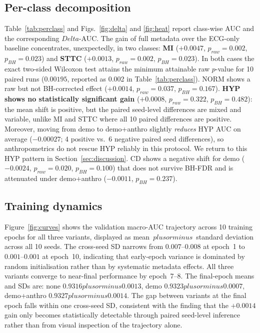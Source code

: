 \documentclass[mathematics,article,submit,pdftex]{Definitions/mdpi}
\def\texttt#1{#1}%
\def\mathrm#1{#1}%
\def\Delta{Delta }%
\def\pm{plus or minus }%
\begin{document}
\subsection{Per-class decomposition}
Table~\ref{tab:perclass} and Figs.~\ref{fig:delta} and \ref{fig:heat} report class-wise AUC and the corresponding $\Delta$-AUC. The gain of full metadata over the ECG-only baseline concentrates, unexpectedly, in two classes: \textbf{MI} ($+0.0047$, $p_{\mathrm{raw}}{=}0.002$, $p_{\mathrm{BH}}{=}0.023$) and \textbf{STTC} ($+0.0013$, $p_{\mathrm{raw}}{=}0.002$, $p_{\mathrm{BH}}{=}0.023$). In both cases the exact two-sided Wilcoxon test attains the minimum attainable raw $p$-value for 10 paired runs ($0.00195$, reported as 0.002 in Table~\ref{tab:perclass}). NORM shows a raw but not BH-corrected effect ($+0.0014$, $p_{\mathrm{raw}}{=}0.037$, $p_{\mathrm{BH}}{=}0.167$). \textbf{HYP shows no statistically significant gain} ($+0.0008$, $p_{\mathrm{raw}}{=}0.322$, $p_{\mathrm{BH}}{=}0.482$): the mean shift is positive, but the paired seed-level differences are mixed and variable, unlike MI and STTC where all 10 paired differences are positive. Moreover, moving from \texttt{demo} to \texttt{demo+anthro} slightly \emph{reduces} HYP AUC on average ($-0.00027$; 4 positive vs.\ 6 negative paired seed differences), so anthropometrics do not rescue HYP reliably in this protocol. We return to this HYP pattern in Section~\ref{sec:discussion}. CD shows a negative shift for \texttt{demo} ($-0.0024$, $p_{\mathrm{raw}}{=}0.020$, $p_{\mathrm{BH}}{=}0.100$) that does not survive BH-FDR and is attenuated under \texttt{demo+anthro} ($-0.0011$, $p_{\mathrm{BH}}{=}0.237$).

\subsection{Training dynamics}
Figure~\ref{fig:curves} shows the validation macro-AUC trajectory across 10 training epochs for all three variants, displayed as mean~$\pm$~standard deviation across all 10 seeds. The cross-seed SD narrows from $0.007$--$0.008$ at epoch~1 to $0.001$--$0.001$ at epoch~10, indicating that early-epoch variance is dominated by random initialisation rather than by systematic metadata effects. All three variants converge to near-final performance by epoch~7--8. The final-epoch means and SDs are: \texttt{none} $0.9316\pm0.0013$, \texttt{demo} $0.9323\pm0.0007$, \texttt{demo+anthro} $0.9327\pm0.0014$. The gap between variants at the final epoch falls within one cross-seed SD, consistent with the finding that the $+0.0014$ gain only becomes statistically detectable through paired seed-level inference rather than from visual inspection of the trajectory alone.
\end{document}
